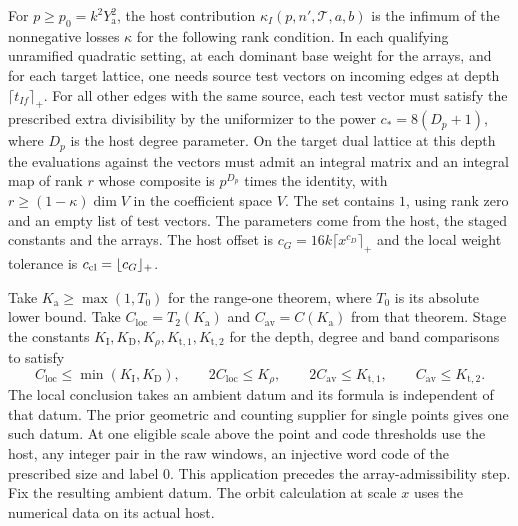 For \(p\ge p_0=k^2Y_{\mathrm a}^2\), the host contribution
\(\kappa_I(p,n',\mathcal T,a,b)\) is the infimum of the
nonnegative losses \(\kappa\) for the following rank condition.
In each qualifying unramified quadratic setting, at each dominant
base weight for the arrays, and for each target lattice, one needs
source test vectors on incoming edges at depth
\(\lceil t_{If}\rceil_+\). For all other edges with the same source,
each test vector must satisfy the prescribed extra divisibility
by the uniformizer to the power \(c_*=8(D_p+1)\), where \(D_p\)
is the host degree parameter. On the target dual lattice at this
depth the evaluations against the vectors must admit an integral
matrix and an integral map of rank \(r\) whose composite is
\(p^{D_p}\) times the identity, with \(r\ge(1-\kappa)\dim V\) in
the coefficient space \(V\). The set contains \(1\), using rank zero
and an empty list of test vectors. The parameters come from the
host, the staged constants and the arrays. The host offset is
\(c_G=16k\lceil x^{c_D}\rceil_+\) and the local weight tolerance
is \(c_{\rm cl}=\lfloor c_G\rfloor_+\).

Take \(K_{\mathrm a}\ge\max(1,T_0)\) for the range-one theorem,
where \(T_0\) is its absolute lower bound. Take
\(C_{\mathrm{loc}}=T_2(K_{\mathrm a})\) and
\(C_{\mathrm{av}}=C(K_{\mathrm a})\) from
that theorem. Stage the constants \(K_{\mathrm I},K_{\mathrm D},
K_\rho,K_{\mathrm{t},1},K_{\mathrm{t},2}\) for the depth, degree
and band comparisons to satisfy
\[
 C_{\mathrm{loc}}\le \min(K_{\mathrm I},K_{\mathrm D}),\qquad
 2C_{\mathrm{loc}}\le K_\rho,\qquad
 2C_{\mathrm{av}}\le K_{\mathrm{t},1},\qquad
 C_{\mathrm{av}}\le K_{\mathrm{t},2}.
\]
The local conclusion takes an ambient datum and its formula is
independent of that datum. The prior geometric and counting
supplier for single points gives one such datum. At one eligible
scale above the point and code thresholds use the host, any
integer pair in the raw windows, an injective word code of the
prescribed size and label \(0\). This application precedes the
array-admissibility step. Fix the resulting ambient datum. The
orbit calculation at scale \(x\) uses the numerical data on its
actual host.


